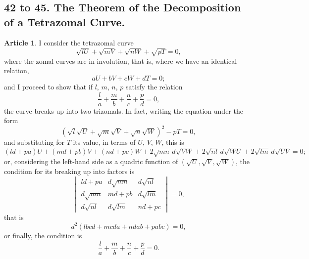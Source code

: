 \documentclass[11pt,a4paper]{article}
\theoremstyle{definition}
\newtheorem{art}{Article}
\begin{document}
\subsection{42 to 45. The Theorem of the Decomposition of a Tetrazomal Curve.}

\begin{art}
I consider the tetrazomal curve
\[
\sqrt{lU} + \sqrt{mV} + \sqrt{nW} + \sqrt{pT} = 0,
\]
where the zomal curves are in involution, that is, where we have an identical relation,
\[
aU + bV + cW + dT = 0;
\]
and I proceed to show that if $l$, $m$, $n$, $p$ satisfy the relation
\[
\frac{l}{a} + \frac{m}{b} + \frac{n}{c} + \frac{p}{d} = 0,
\]
the curve breaks up into two trizomals. In fact, writing the equation under the form
\[
(\sqrt{l}\sqrt{U} + \sqrt{m}\sqrt{V} + \sqrt{n}\sqrt{W})^{2} - pT = 0,
\]
and substituting for $T$ its value, in terms of $U$, $V$, $W$, this is
\[
(ld + pa)U + (md + pb)V + (nd + pc)W + 2\sqrt{mn}\,d\sqrt{VW} + 2\sqrt{nl}\,d\sqrt{WU} + 2\sqrt{lm}\,d\sqrt{UV} = 0;
\]
or, considering the left-hand side as a quadric function of $(\sqrt{U}, \sqrt{V}, \sqrt{W})$, the condition for its breaking up into factors is
\[
\begin{vmatrix}
ld + pa & d\sqrt{mn} & d\sqrt{nl} \\
d\sqrt{mn} & md + pb & d\sqrt{lm} \\
d\sqrt{nl} & d\sqrt{lm} & nd + pc
\end{vmatrix} = 0,
\]
that is
\[
d^{2}(lbcd + mcda + ndab + pabc) = 0,
\]
or finally, the condition is
\[
\frac{l}{a} + \frac{m}{b} + \frac{n}{c} + \frac{p}{d} = 0.
\]
\end{art}
\end{document}
